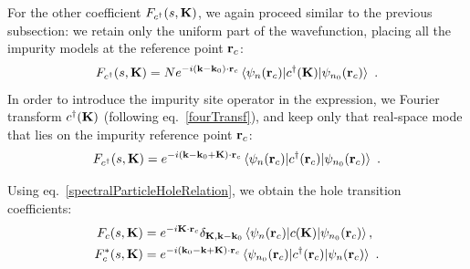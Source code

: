 \documentclass[reprint,hidelinks]{revtex4-2}
\begin{document}
For the other coefficient \(F_{c^\dagger}(s, {\bf K})\), we again proceed similar to the previous subsection: we retain only the uniform part of the wavefunction, placing all the impurity models at the reference point \({\bf r}_c\):
\begin{equation}\begin{aligned}
	F_{c^\dagger}(s, {\bf K}) = Ne^{-i \left({\bf k} - {\bf k}_0\right)\cdot{\bf r}_c} \braket{\psi_n({\bf r}_c)|c^\dagger({\bf K})|\psi_{n_0}({\bf r}_c)}~.
\end{aligned}\end{equation}
In order to introduce the impurity site operator in the expression, we Fourier transform \(c^\dagger({\bf K})\) (following eq.~\ref{fourTransf}), and keep only that real-space mode that lies on the impurity reference point \({\bf r}_c\):
\begin{equation}\begin{aligned}
	F_{c^\dagger}(s, {\bf K}) = e^{-i \left({\bf k} - {\bf k}_0 + {\bf K}\right)\cdot{\bf r}_c} \braket{\psi_n({\bf r}_c)|c^\dagger({\bf r}_c)|\psi_{n_0}({\bf r}_c)}~.
\end{aligned}\end{equation}

Using eq.~\ref{spectralParticleHoleRelation}, we obtain the hole transition coefficients:
\begin{equation}\begin{aligned}
	F_{c}(s, {\bf K}) &= e^{-i {\bf K}\cdot{\bf r}_c}\delta_{{\bf K}, {\bf k} - {\bf k}_0}\braket{\psi_{n}({\bf r}_c)|c({\bf K})|\psi_{n_0}({\bf r}_c)},\\
	F_{c}^*(s, {\bf K}) &= e^{-i \left({\bf k}_0 - {\bf k} + {\bf K}\right)\cdot{\bf r}_c} \braket{\psi_{n_0}({\bf r}_c)|c^\dagger({\bf r}_c)|\psi_{n}({\bf r}_c)}~.
\end{aligned}\end{equation}
\end{document}
